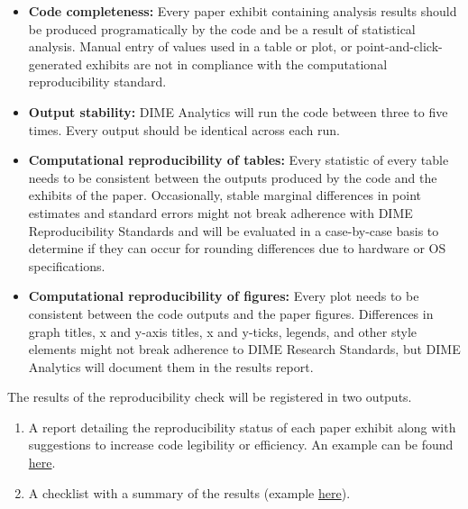 \begin{fullwidth}
	\begin{itemize}
		\setlength\itemsep{-0.1em}
		\item \textbf{Code completeness:} Every paper exhibit containing analysis results should be produced programatically by the code and be a result of statistical analysis. Manual entry of values used in a table or plot, or point-and-click-generated exhibits are not in compliance with the computational reproducibility standard.
		\item \textbf{Output stability:} DIME Analytics will run the code between three to five times. Every output should be  identical across each run.
		\item \textbf{Computational reproducibility of tables:} Every statistic of every table needs to be consistent between the outputs produced by the code and the exhibits of the paper. Occasionally, stable marginal differences in point estimates and standard errors might not break adherence with DIME Reproducibility Standards and will be evaluated in a case-by-case basis to determine if they can occur for rounding differences due to hardware or OS specifications.
		\item \textbf{Computational reproducibility of figures:} Every plot needs to be consistent between the code outputs and the paper figures. Differences in graph titles, x and y-axis titles, x and y-ticks, legends, and other style elements might not break adherence to DIME Research Standards, but DIME Analytics will document them in the results report.
	\end{itemize}

	\bigskip
	
	The results of the reproducibility check will be registered in two outputs.

	\bigskip

	\begin{enumerate}
		\setlength\itemsep{-0.1em}
		\item A report detailing the reproducibility status of each paper exhibit along with suggestions to increase code legibility or efficiency. An example can be found \href{https://github.com/worldbank/dime-standards/blob/master/dime-research-standards/pillar-3-research-reproducibility/DIME%20Analytics%20Reproducibility%20Check%20Comments%20example.pdf}{here}.
		\item A checklist with a summary of the results (example \href{https://raw.githubusercontent.com/worldbank/dime-standards/master/dime-research-standards/pillar-3-research-reproducibility/checklists/Reproducibility%20check%20result%20template.pdf}{here}).
	\end{enumerate}


\end{fullwidth}
